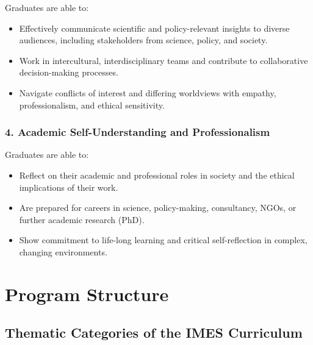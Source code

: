 \documentclass[
  letterpaper,
  10pt,
  openany]{book}
\providecommand{\tightlist}{%
  \setlength{\itemsep}{0pt}\setlength{\parskip}{0pt}}\usepackage{longtable,booktabs,array}
\begin{document}
Graduates are able to:

\begin{itemize}
\tightlist
\item
  Effectively communicate scientific and policy-relevant insights to
  diverse audiences, including stakeholders from science, policy, and
  society.
\item
  Work in intercultural, interdisciplinary teams and contribute to
  collaborative decision-making processes.
\item
  Navigate conflicts of interest and differing worldviews with empathy,
  professionalism, and ethical sensitivity.
\end{itemize}

\subsection*{4. Academic Self-Understanding and
Professionalism}\label{academic-self-understanding-and-professionalism}

Graduates are able to:

\begin{itemize}
\tightlist
\item
  Reflect on their academic and professional roles in society and the
  ethical implications of their work.
\item
  Are prepared for careers in science, policy-making, consultancy, NGOs,
  or further academic research (PhD).
\item
  Show commitment to life-long learning and critical self-reflection in
  complex, changing environments.
\end{itemize}

\chapter*{Program Structure}\label{program-structure}


\section*{Thematic Categories of the IMES
Curriculum}\label{thematic-categories-of-the-imes-curriculum}
\end{document}
